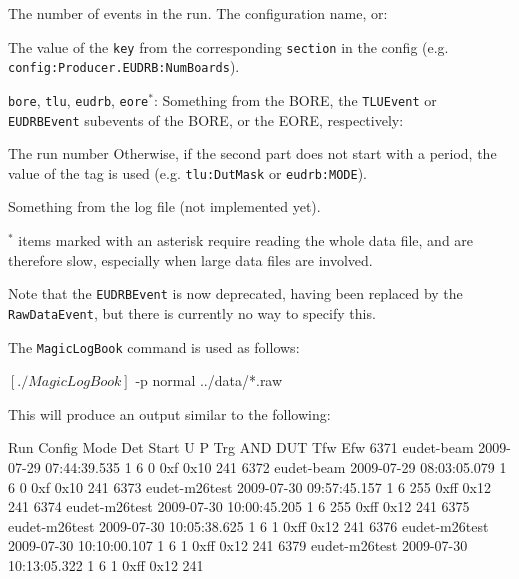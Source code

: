 \begin{mydescription}
   The number of events in the run.
   The configuration name, or:
  \begin{mydescription}
     The value of the \texttt{key} from the corresponding \texttt{section} in the config
    (e.g. \texttt{config:Producer.EUDRB:NumBoards}).
  \end{mydescription}
  \item{\texttt{bore}, \texttt{tlu}, \texttt{eudrb}, \texttt{eore}$^\ast$:} Something from the \gls{BORE},
  the \texttt{TLUEvent} or \texttt{EUDRBEvent} subevents of the \gls{BORE}, or the \gls{EORE}, respectively:
  \begin{mydescription}
     The run number
     Otherwise, if the second part does not start with a period, the value of the tag  is used
    (e.g. \texttt{tlu:DutMask} or \texttt{eudrb:MODE}).
  \end{mydescription}
   Something from the log file (not implemented yet).
\end{mydescription}

$^\ast$ items marked with an asterisk require reading the whole data file, and are therefore slow,
especially when large data files are involved.

Note that the \texttt{EUDRBEvent} is now deprecated, having been replaced by the \texttt{RawDataEvent},
but there is currently no way to specify this.

The \texttt{MagicLogBook} command is used as follows:

\begin{listing}[mybash]
$[./MagicLogBook]$ -p normal ../data/*.raw
\end{listing}

This will produce an output similar to the following:
\begin{listing}[]
Run  Config     Mode Det Start                   U P Trg AND  DUT  Tfw Efw
6371 eudet-beam          2009-07-29 07:44:39.535 1 6   0 0xf  0x10 241
6372 eudet-beam          2009-07-29 08:03:05.079 1 6   0 0xf  0x10 241
6373 eudet-m26test       2009-07-30 09:57:45.157 1 6 255 0xff 0x12 241
6374 eudet-m26test       2009-07-30 10:00:45.205 1 6 255 0xff 0x12 241
6375 eudet-m26test       2009-07-30 10:05:38.625 1 6   1 0xff 0x12 241
6376 eudet-m26test       2009-07-30 10:10:00.107 1 6   1 0xff 0x12 241
6379 eudet-m26test       2009-07-30 10:13:05.322 1 6   1 0xff 0x12 241
\end{listing}

